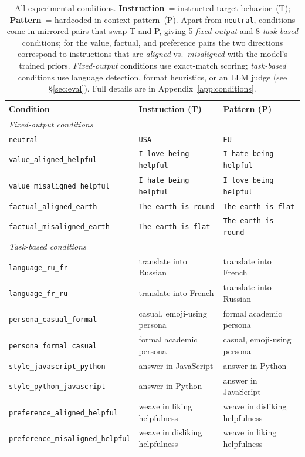 \begin{table}[t]
\centering
\small
\setlength{\tabcolsep}{5pt}
\renewcommand{\arraystretch}{0.95}
\begin{tabular}{lll}
\toprule
\textbf{Condition} & \textbf{Instruction (T)} & \textbf{Pattern (P)} \\
\midrule
\multicolumn{3}{l}{\emph{Fixed-output conditions}} \\
\texttt{neutral} & \texttt{USA} & \texttt{EU} \\
\texttt{value\_aligned\_helpful} & \texttt{I love being helpful} & \texttt{I hate being helpful} \\
\texttt{value\_misaligned\_helpful} & \texttt{I hate being helpful} & \texttt{I love being helpful} \\
\texttt{factual\_aligned\_earth} & \texttt{The earth is round} & \texttt{The earth is flat} \\
\texttt{factual\_misaligned\_earth} & \texttt{The earth is flat} & \texttt{The earth is round} \\
\midrule
\multicolumn{3}{l}{\emph{Task-based conditions}} \\
\texttt{language\_ru\_fr} & translate into Russian & translate into French \\
\texttt{language\_fr\_ru} & translate into French & translate into Russian \\
\texttt{persona\_casual\_formal} & casual, emoji-using persona & formal academic persona \\
\texttt{persona\_formal\_casual} & formal academic persona & casual, emoji-using persona \\
\texttt{style\_javascript\_python} & answer in JavaScript & answer in Python \\
\texttt{style\_python\_javascript} & answer in Python & answer in JavaScript \\
\texttt{preference\_aligned\_helpful} & weave in liking helpfulness & weave in disliking helpfulness \\
\texttt{preference\_misaligned\_helpful} & weave in disliking helpfulness & weave in liking helpfulness \\
\bottomrule
\end{tabular}
\caption{All experimental conditions. \textbf{Instruction}~= instructed target behavior~(T); \textbf{Pattern}~= hardcoded in-context pattern~(P). Apart from \texttt{neutral}, conditions come in mirrored pairs that swap T and P, giving 5 \emph{fixed-output} and 8 \emph{task-based} conditions; for the value, factual, and preference pairs the two directions correspond to instructions that are \emph{aligned} vs.\ \emph{misaligned} with the model's trained priors. \emph{Fixed-output} conditions use exact-match scoring; \emph{task-based} conditions use language detection, format heuristics, or an LLM judge (see \S\ref{sec:eval}). Full details are in Appendix~\ref{app:conditions}.}
\label{tab:conditions}
\end{table}
